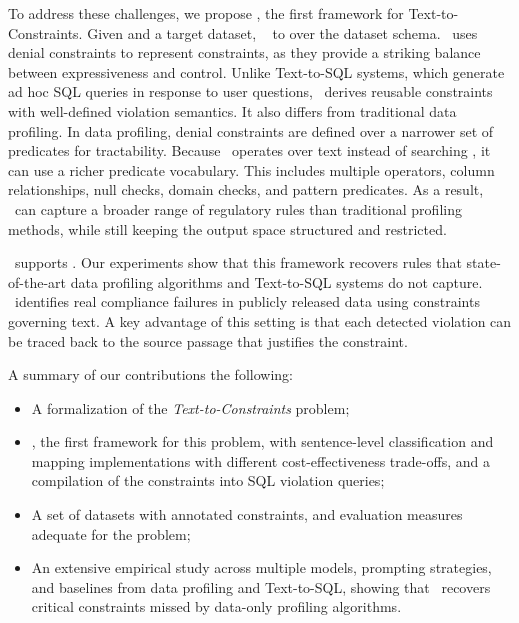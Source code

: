 To address these challenges, we propose \system, the first framework for Text-to-Constraints. Given  and a target dataset, \system\  to  over the dataset schema. \system\ uses denial constraints to represent constraints, as they provide a striking balance between expressiveness and control. Unlike Text-to-SQL systems, which generate ad hoc SQL queries in response to user questions, \system\ derives reusable constraints with well-defined violation semantics. It also differs from traditional data profiling. In data profiling, denial constraints are defined over a narrower set of predicates for tractability. Because \system\ operates over text instead of searching , it can use a richer predicate vocabulary. This includes multiple operators, column relationships, null checks, domain checks, and pattern predicates. As a result, \system\ can capture a broader range of regulatory rules than traditional profiling methods, while still keeping the output space structured and restricted.

\system\ supports . Our experiments show that this framework recovers rules that state-of-the-art data profiling algorithms and Text-to-SQL systems do not capture. \system\ identifies real compliance failures in publicly released data using constraints  governing text. A key advantage of this setting is that each detected violation can be traced back to the source passage that justifies the constraint.


A summary of our contributions  the following:
\begin{itemize}[leftmargin=0.35cm]
\item A formalization of the \emph{Text-to-Constraints} problem;
\item \system, the first framework for this problem, with sentence-level classification and mapping implementations with different cost-effectiveness trade-offs, and a compilation of the  constraints into SQL violation queries;
\item A set of datasets with annotated constraints, and evaluation measures adequate for the  problem;
\item An extensive empirical study across multiple models, prompting strategies, and baselines from data profiling and Text-to-SQL, showing that \system\ recovers critical constraints missed by data-only profiling algorithms.
\end{itemize}

